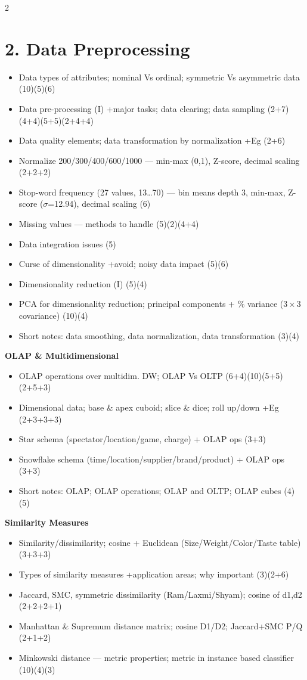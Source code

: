 \documentclass[10pt]{article}
\begin{document}
\begin{multicols}{2}
\section*{2. Data Preprocessing}
\begin{itemize}
  \item Data types of attributes; nominal Vs ordinal; symmetric Vs asymmetric data \hfill (10)(5)(6)
  \item Data pre-processing (I) +major tasks; data clearing; data sampling \hfill (2+7)(4+4)(5+5)(2+4+4)
  \item Data quality elements; data transformation by normalization +Eg \hfill (2+6)
  \item Normalize 200/300/400/600/1000 --- min-max (0,1), Z-score, decimal scaling \hfill (2+2+2)
  \item Stop-word frequency (27 values, 13\dots70) --- bin means depth 3, min-max, Z-score ($\sigma$=12.94), decimal scaling \hfill (6)
  \item Missing values --- methods to handle \hfill (5)(2)(4+4)
  \item Data integration issues \hfill (5)
  \item Curse of dimensionality +avoid; noisy data impact \hfill (5)(6)
  \item Dimensionality reduction (I) \hfill (5)(4)
  \item PCA for dimensionality reduction; principal components + \% variance ($3\times3$ covariance) \hfill (10)(4)
  \item Short notes: data smoothing, data normalization, data transformation \hfill (3)(4)
\end{itemize}
\textbf{OLAP \& Multidimensional}
\begin{itemize}
  \item OLAP operations over multidim. DW; OLAP Vs OLTP \hfill (6+4)(10)(5+5)(2+5+3)
  \item Dimensional data; base \& apex cuboid; slice \& dice; roll up/down +Eg \hfill (2+3+3+3)
  \item Star schema (spectator/location/game, charge) + OLAP ops \hfill (3+3)
  \item Snowflake schema (time/location/supplier/brand/product) + OLAP ops \hfill (3+3)
  \item Short notes: OLAP; OLAP operations; OLAP and OLTP; OLAP cubes \hfill (4)(5)
\end{itemize}
\textbf{Similarity Measures}
\begin{itemize}
  \item Similarity/dissimilarity; cosine + Euclidean (Size/Weight/Color/Taste table) \hfill (3+3+3)
  \item Types of similarity measures +application areas; why important \hfill (3)(2+6)
  \item Jaccard, SMC, symmetric dissimilarity (Ram/Laxmi/Shyam); cosine of d1,d2 \hfill (2+2+2+1)
  \item Manhattan \& Supremum distance matrix; cosine D1/D2; Jaccard+SMC P/Q \hfill (2+1+2)
  \item Minkowski distance --- metric properties; metric in instance based classifier \hfill (10)(4)(3)
\end{itemize}


\end{multicols}
\end{document}
